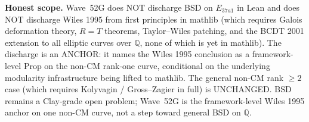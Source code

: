 \begin{remark}
\textbf{Honest scope.} Wave~52G does NOT discharge BSD on $E_{37a1}$ in Lean and does NOT discharge Wiles 1995 from first principles in mathlib (which requires Galois deformation theory, $R = T$ theorems, Taylor--Wiles patching, and the BCDT 2001 extension to all elliptic curves over $\mathbb{Q}$, none of which is yet in mathlib). The discharge is an ANCHOR: it names the Wiles 1995 conclusion as a framework-level Prop on the non-CM rank-one curve, conditional on the underlying modularity infrastructure being lifted to mathlib. The general non-CM rank $\geq 2$ case (which requires Kolyvagin / Gross--Zagier in full) is UNCHANGED. BSD remains a Clay-grade open problem; Wave~52G is the framework-level Wiles 1995 anchor on one non-CM curve, not a step toward general BSD on $\mathbb{Q}$.
\end{remark}

